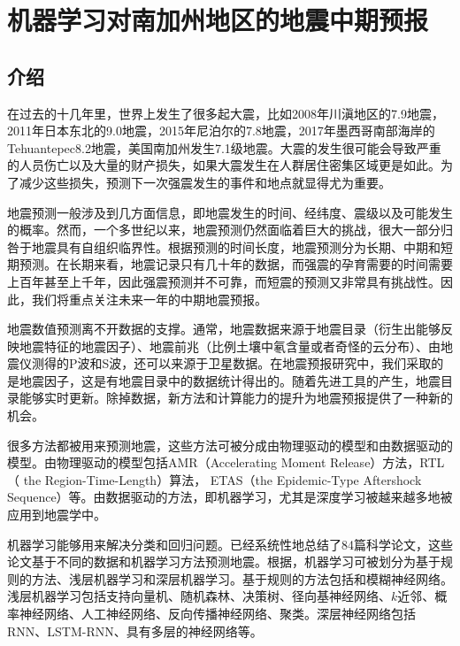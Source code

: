 \chapter{机器学习对南加州地区的地震中期预报}\label{chap:ml_seismic}

\section{介绍}
在过去的十几年里，世界上发生了很多起大震，比如2008年川滇地区的7.9地震，2011年日本东北的9.0地震，2015年尼泊尔的7.8地震，2017年墨西哥南部海岸的Tehuantepec8.2地震，美国南加州发生7.1级地震。大震的发生很可能会导致严重的人员伤亡以及大量的财产损失，如果大震发生在人群居住密集区域更是如此。为了减少这些损失，预测下一次强震发生的事件和地点就显得尤为重要。

地震预测一般涉及到几方面信息，即地震发生的时间、经纬度、震级以及可能发生的概率\citep{Allen1976Responsibilities}。然而，一个多世纪以来，地震预测仍然面临着巨大的挑战，很大一部分归咎于地震具有自组织临界性\citep{Geller2007Earthquake}。根据预测的时间长度，地震预测分为长期、中期和短期预测\citep{Zhang2002An,Pulinets2018What}。在长期来看，地震记录只有几十年的数据，而强震的孕育需要的时间需要上百年甚至上千年，因此强震预测并不可靠，而短震的预测又非常具有挑战性。因此，我们将重点关注未来一年的中期地震预报。

地震数值预测离不开数据的支撑。通常，地震数据来源于地震目录（衍生出能够反映地震特征的地震因子）、地震前兆（比例土壤中氡含量或者奇怪的云分布）、由地震仪测得的P波和S波，还可以来源于卫星数据\citep{al2020application}。在地震预报研究中，我们采取的是地震因子，这是有地震目录中的数据统计得出的。随着先进工具的产生，地震目录能够实时更新。除掉数据，新方法和计算能力的提升为地震预报提供了一种新的机会。

很多方法都被用来预测地震，这些方法可被分成由物理驱动的模型和由数据驱动的模型。由物理驱动的模型包括AMR（Accelerating Moment Release）方法\citep{Ben2002Accelerated}，RTL（
the Region-Time-Length）算法\citep{Sobolev2007On}， ETAS（the Epidemic-Type Aftershock Sequence）\citep{Ogata1986Statistical}等。由数据驱动的方法，即机器学习，尤其是深度学习被越来越多地被应用到地震学中\citep{Alves2006Earthquake,Madahizadeh2009prediction,Panakkat2007Neural,Sunkara2009Model}。

机器学习能够用来解决分类和回归问题。\citet{al2020application}已经系统性地总结了84篇科学论文，这些论文基于不同的数据和机器学习方法预测地震。根据\citep{al2020application}，机器学习可被划分为基于规则的方法、浅层机器学习和深层机器学习。基于规则的方法包括\citep{zhong2010prediction,zamani2013application,mirrashid2014earthquake}和模糊神经网络\citep{Lopez2019Evolutionary}。浅层机器学习包括支持向量机\citep{asencio2017temporal}、随机森林\citep{asim2017earthquake}、决策树\citep{asencio2017temporal}、径向基神经网络\citep{Alexandridis2014Large}、$k$近邻\citep{asencio2017temporal,Panakkat2007Neural}、概率神经网络\citep{Adeli2009A}、人工神经网络\citep{morales2013earthquake,asencio2017temporal}、反向传播神经网络\citep{Panakkat2007Neural,Narayanakumar2016A}、聚类\citep{shodiq2018neural}。深层神经网络包括RNN\citep{Panakkat2009Recurrent,asim2017earthquake}、LSTM-RNN\citep{Wang2017Earthquake,Bhatia2018EARTHQUAKE,berhich2020lstm}、具有多层的神经网络\citep{huang2018large}等。

